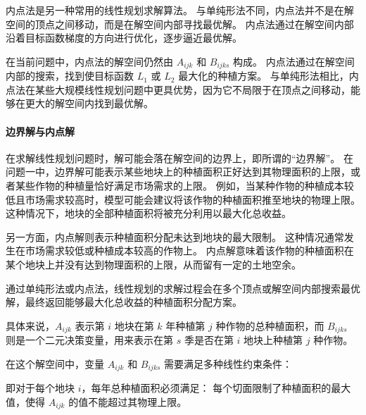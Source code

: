 \documentclass[12pt,a4paper]{nmmcm}
\begin{document}
内点法是另一种常用的线性规划求解算法。
与单纯形法不同，内点法并不是在解空间的顶点之间移动，而是在解空间内部寻找最优解。
内点法通过在解空间内部沿着目标函数梯度的方向进行优化，逐步逼近最优解。


在当前问题中，内点法的解空间仍然由 $A_{ijk}$ 和 $B_{ijks}$ 构成。
内点法通过在解空间内部的搜索，找到使目标函数 $L_1$ 或 $L_2$ 最大化的种植方案。
与单纯形法相比，内点法在某些大规模线性规划问题中更具优势，因为它不局限于在顶点之间移动，能够在更大的解空间内找到最优解。


\paragraph{边界解与内点解}

在求解线性规划问题时，解可能会落在解空间的边界上，即所谓的“边界解”。
在问题一中，边界解可能表示某些地块上的种植面积正好达到其物理面积的上限，或者某些作物的种植量恰好满足市场需求的上限。
例如，当某种作物的种植成本较低且市场需求较高时，模型可能会建议将该作物的种植面积推至地块的物理上限。
这种情况下，地块的全部种植面积将被充分利用以最大化总收益。


另一方面，内点解则表示种植面积分配未达到地块的最大限制。
这种情况通常发生在市场需求较低或种植成本较高的作物上。
内点解意味着该作物的种植面积在某个地块上并没有达到物理面积的上限，从而留有一定的土地空余。


通过单纯形法或内点法，线性规划的求解过程会在多个顶点或解空间内部搜索最优解，最终返回能够最大化总收益的种植面积分配方案。




具体来说，$A_{ijk}$ 表示第 $i$ 地块在第 $k$ 年种植第 $j$ 种作物的总种植面积，而 $B_{ijks}$ 则是一个二元决策变量，用来表示在第 $s$ 季是否在第 $i$ 地块上种植第 $j$ 种作物。


在这个解空间中，变量 $A_{ijk}$ 和 $B_{ijks}$ 需要满足多种线性约束条件：

即对于每个地块 $i$，每年总种植面积必须满足：
每个切面限制了种植面积的最大值，使得 $A_{ijk}$ 的值不能超过其物理上限。
\end{document}
